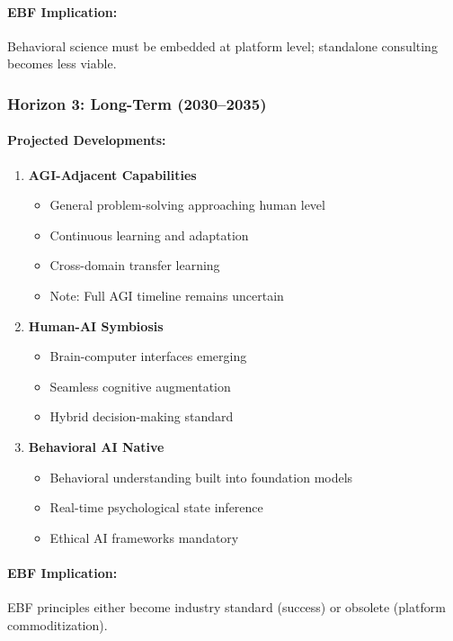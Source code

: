 \paragraph{EBF Implication:} Behavioral science must be embedded at platform
level; standalone consulting becomes less viable.

\subsubsection{Horizon 3: Long-Term (2030--2035)}

\paragraph{Projected Developments:}
\begin{enumerate}
    \item \textbf{AGI-Adjacent Capabilities}
    \begin{itemize}
        \item General problem-solving approaching human level
        \item Continuous learning and adaptation
        \item Cross-domain transfer learning
        \item Note: Full AGI timeline remains uncertain
    \end{itemize}

    \item \textbf{Human-AI Symbiosis}
    \begin{itemize}
        \item Brain-computer interfaces emerging
        \item Seamless cognitive augmentation
        \item Hybrid decision-making standard
    \end{itemize}

    \item \textbf{Behavioral AI Native}
    \begin{itemize}
        \item Behavioral understanding built into foundation models
        \item Real-time psychological state inference
        \item Ethical AI frameworks mandatory
    \end{itemize}
\end{enumerate}

\paragraph{EBF Implication:} EBF principles either become industry standard
(success) or obsolete (platform commoditization).

